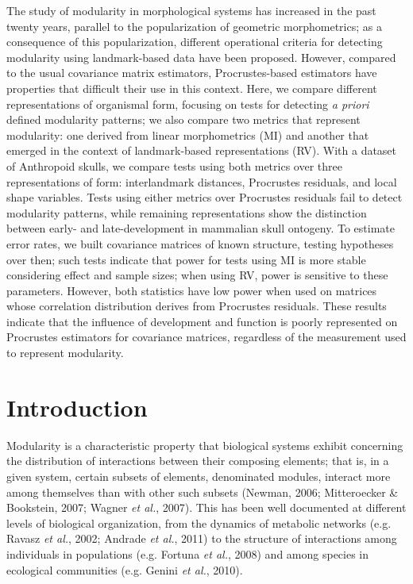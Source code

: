 \documentclass[12pt,twoside]{report}
\begin{document}
The study of modularity in morphological systems has increased in the
past twenty years, parallel to the popularization of geometric
morphometrics; as a consequence of this popularization, different
operational criteria for detecting modularity using landmark-based data
have been proposed. However, compared to the usual covariance matrix
estimators, Procrustes-based estimators have properties that difficult
their use in this context. Here, we compare different representations of
organismal form, focusing on tests for detecting \emph{a priori} defined
modularity patterns; we also compare two metrics that represent
modularity: one derived from linear morphometrics (MI) and another that
emerged in the context of landmark-based representations (RV). With a
dataset of Anthropoid skulls, we compare tests using both metrics over
three representations of form: interlandmark distances, Procrustes
residuals, and local shape variables. Tests using either metrics over
Procrustes residuals fail to detect modularity patterns, while remaining
representations show the distinction between early- and late-development
in mammalian skull ontogeny. To estimate error rates, we built
covariance matrices of known structure, testing hypotheses over then;
such tests indicate that power for tests using MI is more stable
considering effect and sample sizes; when using RV, power is sensitive
to these parameters. However, both statistics have low power when used
on matrices whose correlation distribution derives from Procrustes
residuals. These results indicate that the influence of development and
function is poorly represented on Procrustes estimators for covariance
matrices, regardless of the measurement used to represent modularity.

\section{Introduction}\label{introduction}

Modularity is a characteristic property that biological systems exhibit
concerning the distribution of interactions between their composing
elements; that is, in a given system, certain subsets of elements,
denominated modules, interact more among themselves than with other such
subsets (Newman, 2006; Mitteroecker \& Bookstein, 2007; Wagner \emph{et
al.}, 2007). This has been well documented at different levels of
biological organization, from the dynamics of metabolic networks (e.g.
Ravasz \emph{et al.}, 2002; Andrade \emph{et al.}, 2011) to the
structure of interactions among individuals in populations (e.g. Fortuna
\emph{et al.}, 2008) and among species in ecological communities (e.g.
Genini \emph{et al.}, 2010).
\end{document}
